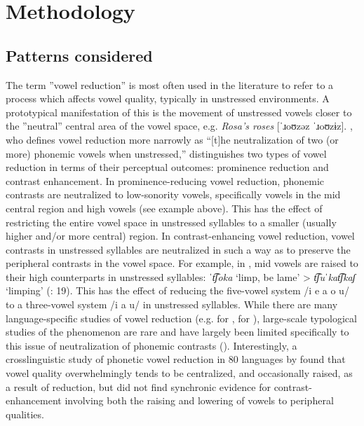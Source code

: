 \section{ Methodology}\label{sec:6.2}
\subsection{ Patterns considered}\label{sec:6.2.1}

  The term ”vowel reduction” is most often used in the literature to refer to a process which affects vowel quality, typically in unstressed environments. A prototypical manifestation of this is the movement of unstressed vowels closer to the ”neutral” central area of the vowel space, e.g.  \textit{Rosa’s roses} [\textit{ˈ}ɹoʊzəz \textit{ˈ}ɹoʊzɨz]. \citet[1]{Crosswhite2000}, who defines vowel reduction more narrowly as “[t]he neutralization of two (or more) phonemic vowels when unstressed,” distinguishes two types of vowel reduction in terms of their perceptual outcomes: prominence reduction and contrast enhancement. In prominence-reducing vowel reduction, phonemic contrasts are neutralized to low-sonority vowels, specifically vowels in the mid central region and high vowels (see  example above). This has the effect of restricting the entire vowel space in unstressed syllables to a smaller (usually higher and/or more central) region. In contrast-enhancing vowel reduction, vowel contrasts in unstressed syllables are neutralized in such a way as to preserve the peripheral contrasts in the vowel space. For example, in , mid vowels are raised to their high counterparts in unstressed syllables: \textit{ˈt͡ʃoka} ‘limp, be lame’ > \textit{t͡ʃuˈkat͡ʃkaʃ} ‘limping’ (\citealt{MunroBenson1973}: 19). This has the effect of reducing the five-vowel system /i e a o u/ to a three-vowel system /i a u/ in unstressed syllables. While there are many language-specific studies of vowel reduction (e.g. \citealt{Lindblom1963} for , \citealt{PadgettTabain2005} for ), large-scale typological studies of the phenomenon are rare and have largely been limited specifically to this issue of neutralization of phonemic contrasts (\citealt{Crosswhite2001,Crosswhite2004,Barnes2006}). Interestingly, a crosslinguistic study of phonetic vowel reduction in 80 languages by \citet{KapatsinskiEtAl2019} found that vowel quality overwhelmingly tends to be centralized, and occasionally raised, as a result of reduction, but did not find synchronic evidence for contrast-enhancement involving both the raising and lowering of vowels to peripheral qualities.

